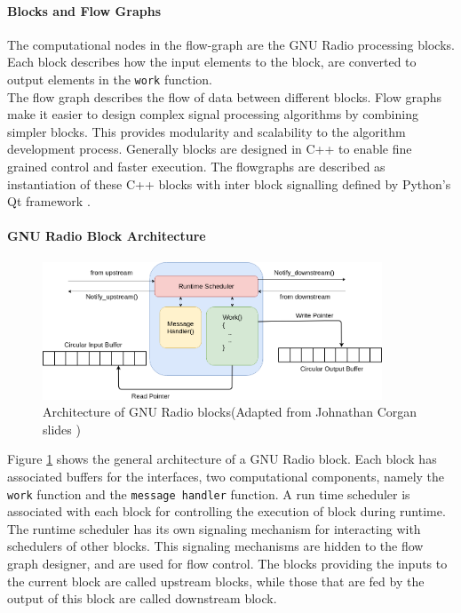 \paragraph{Blocks and Flow Graphs}

The computational nodes in the flow-graph are the GNU Radio processing blocks.
Each block describes how the input elements to the block, are converted to output elements in the \texttt{work} function.\\

The flow graph describes the flow of data between different blocks.
Flow graphs make it easier to design complex signal processing algorithms by combining simpler blocks.
This provides modularity and scalability to the algorithm development process.
Generally blocks are designed in C++ to enable fine grained control and faster execution.
The flowgraphs are described as instantiation of these C++ blocks with inter block signalling defined by Python's Qt framework \cite{noauthor_signals_nodate}.\\

\paragraph{GNU Radio Block Architecture}
\begin{figure}[h!]
\centering
\includegraphics[width=0.9\textwidth]{Figure/Block.png}
\caption{Architecture of GNU Radio blocks(Adapted from Johnathan Corgan slides \cite{corgan_gnu_2015})}
\label{block_arch}
\end{figure}

Figure \ref{block_arch} shows the general architecture of a GNU Radio block. 
Each block has associated buffers for the interfaces, two computational components, namely the \texttt{work} function and the \texttt{message handler} function.
A run time scheduler is associated with each block for controlling the execution of block during runtime. The runtime scheduler has its own signaling mechanism for interacting with schedulers of other blocks.
This signaling mechanisms are hidden to the flow graph designer, and are used for flow control.
The blocks providing the inputs to the current block are called upstream blocks, while those that are fed by the output of this block are called downstream block.\\

